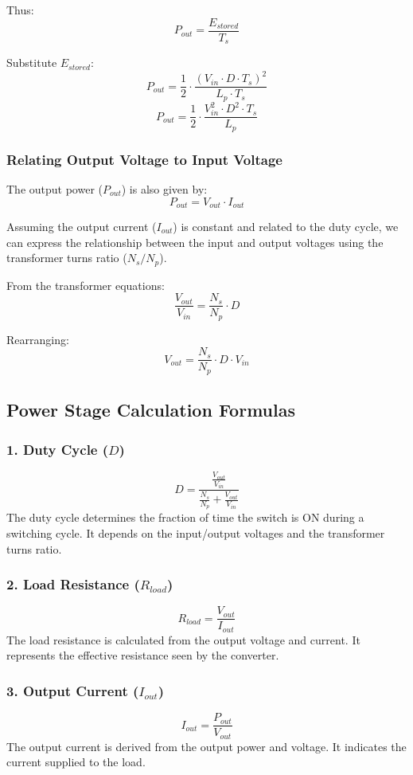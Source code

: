 Thus:
\[
P_{out} = \frac{E_{stored}}{T_s}
\]

Substitute $E_{stored}$:
\[
P_{out} = \frac{1}{2} \cdot \frac{(V_{in} \cdot D \cdot T_s)^2}{L_p \cdot T_s}
\]
\[
P_{out} = \frac{1}{2} \cdot \frac{V_{in}^2 \cdot D^2 \cdot T_s}{L_p}
\]

\subsubsection*{Relating Output Voltage to Input Voltage}
The output power ($P_{out}$) is also given by:
\[
P_{out} = V_{out} \cdot I_{out}
\]

Assuming the output current ($I_{out}$) is constant and related to the duty cycle, we can express the relationship between the input and output voltages using the transformer turns ratio ($N_s/N_p$).

From the transformer equations:
\[
\frac{V_{out}}{V_{in}} = \frac{N_s}{N_p} \cdot D
\]

Rearranging:
\[
V_{out} = \frac{N_s}{N_p} \cdot D \cdot V_{in}
\]
\subsection{Power Stage Calculation Formulas}
\subsubsection*{1. Duty Cycle ($D$)}
$$
D = \frac{\frac{V_{out}}{V_{in}}}{\frac{N_s}{N_p} + \frac{V_{out}}{V_{in}}}
$$
The duty cycle determines the fraction of time the switch is ON during a switching cycle. It depends on the input/output voltages and the transformer turns ratio.

\subsubsection*{2. Load Resistance ($R_{load}$)}
$$
R_{load} = \frac{V_{out}}{I_{out}}
$$
The load resistance is calculated from the output voltage and current. It represents the effective resistance seen by the converter.

\subsubsection*{3. Output Current ($I_{out}$)}
$$
I_{out} = \frac{P_{out}}{V_{out}}
$$
The output current is derived from the output power and voltage. It indicates the current supplied to the load.

